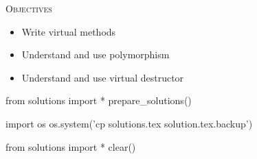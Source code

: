 
\textsc{Objectives}

\begin{itemize}
\item
  Write virtual methods
\item
  Understand and use polymorphism
\item
  Understand and use virtual destructor
\end{itemize}








\begin{python0}
from solutions import *
prepare_solutions()
\end{python0}
\begin{python}
import os
os.system('cp solutions.tex solution.tex.backup')  
\end{python}

\begin{python0}
from solutions import *
clear()
\end{python0}
